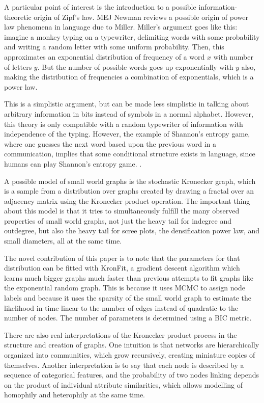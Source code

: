 \documentclass[12pt]{article}
\begin{document}
A particular point of interest is the introduction to a possible information-theoretic origin of Zipf's law. MEJ Newman reviews a possible origin of power law phenomena in language due to Miller\cite{gamiller}. Miller's argument goes like this: imagine a monkey typing on a typewriter, delimiting words with some probability and writing a random letter with some uniform probability. Then, this approximates an exponential distribution of frequency of a word $x$ with number of letters $y$. But the number of possible words goes up exponentially with $y$ also, making the distribution of frequencies a combination of exponentials, which is a power law.

This is a simplistic argument, but can be made less simplistic in talking about arbitrary information in bits instead of symbols in a normal alphabet. However, this theory is only compatible with a random typewriter of information with independence of the typing. However, the example of Shannon's entropy game, where one guesses the next word based upon the previous word in a communication, implies that some conditional structure exists in language, since humans can play Shannon's entropy game. \cite{shannon}
. 

A possible model of small world graphs is the stochastic Kronecker graph\cite{kronfit}, which is a sample from a distribution over graphs created by drawing a fractal over an adjacency matrix using the Kronecker product operation. The important thing about this model is that it tries to simultaneously fulfill the many observed properties of small world graphs, not just the heavy tail for indegree and outdegree, but also the heavy tail for scree plots, the densification power law, and small diameters, all at the same time.

The novel contribution of this paper is to note that the parameters for that distribution can be fitted with KronFit, a gradient descent algorithm which learns much bigger graphs much faster than previous attempts to fit graphs like the exponential random graph. This is because it uses MCMC to assign node labels and because it uses the sparsity of the small world graph to estimate the likelihood in time linear to the number of edges instead of quadratic to the number of nodes. The number of parameters is determined using a BIC metric.

There are also real interpretations of the Kronecker product process in the structure and creation of graphs. One intuition is that networks are hierarchically organized into communities, which grow recursively, creating miniature copies of themselves. Another interpretation is to say that each node is described by a sequence of categorical features, and the probability of two nodes linking depends on the product of individual attribute similarities, which allows modelling of homophily and heterophily at the same time.
\end{document}

